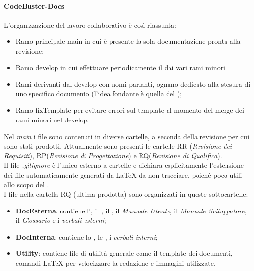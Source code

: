 \paragraph{CodeBuster-Docs}
L'organizzazione del lavoro collaborativo è così riassunta:
\begin{itemize}
	\item Ramo principale main in cui è presente la sola documentazione pronta alla revisione;	
	\item Ramo develop in cui effettuare periodicamente il  dai vari rami minori;
	\item Rami derivanti dal develop con nomi parlanti, ognuno dedicato alla stesura di uno specifico documento (l'idea fondante è quella del );
	\item Ramo fixTemplate per evitare errori sul template al momento del merge dei rami minori nel develop.
\end{itemize}
Nel \textit{main} i file sono contenuti in diverse cartelle, a seconda della revisione per cui sono stati prodotti. Attualmente sono presenti le cartelle RR (\textit{Revisione dei Requisiti}), RP(\textit{Revisione di Progettazione}) e RQ(\textit{Revisione di Qualifica}). \\
Il file \textit{.gitignore} è l'unico esterno a cartelle e dichiara esplicitamente l'estensione dei file automaticamente generati da \LaTeX{} da non tracciare, poiché poco utili allo scopo del . \\
I file nella cartella RQ (ultima prodotta) sono organizzati in queste sottocartelle:
\begin{itemize}
	\item \textbf{DocEsterna}: contiene l'\AdR{}, il \PdP{}, il \PdQ{}, il \textit{Manuale Utente}, il \textit{Manuale Sviluppatore}, il \textit{Glossario} e i \textit{verbali esterni};
	\item \textbf{DocInterna}: contiene lo \SdF{}, le \NdP{}, i \textit{verbali interni};
	\item \textbf{Utility}: contiene file di utilità generale come il template dei documenti, comandi \LaTeX{} per velocizzare la redazione e immagini utilizzate.
\end{itemize}
	
